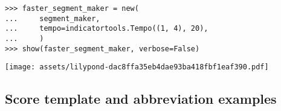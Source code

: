 \begin{comment}
<abjad>[stylesheet=../consort.ily]
faster_segment_maker = new(
    segment_maker,
    tempo=indicatortools.Tempo((1, 4), 20),
    )
show(faster_segment_maker, verbose=False)
</abjad>
\end{comment}

\begin{singlespacing}
\vspace{-0.5\baselineskip}
\begin{lstlisting}
>>> faster_segment_maker = new(
...     segment_maker,
...     tempo=indicatortools.Tempo((1, 4), 20),
...     )
>>> show(faster_segment_maker, verbose=False)
\end{lstlisting}
\noindent\texttt{[image: assets/lilypond-dac8ffa35eb4dae93ba418fbf1eaf390.pdf]}
\end{singlespacing}

\subsection{Score template and abbreviation examples}

\begin{comment}
<abjad>
import armilla
armilla_score_template = armilla.makers.ArmillaScoreTemplate()
armilla_score = armilla_score_template()
print(format(armilla_score))
for item in armilla_score_template.context_name_abbreviations.items():
    abbreviation, context_name = item
    print(abbreviation, context_name)

for item in armilla_score_template.composite_context_pairs.items():
    grouping_abbreviation, grouped_abbreviations = item
    print(grouping_abbreviation, grouped_abbreviations)

</abjad>
\end{comment}


